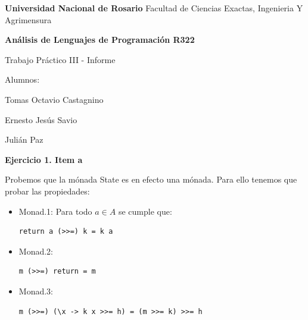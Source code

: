 \begin{flushleft}

  \begin{center}
    \textbf{\Huge{Universidad Nacional de Rosario}}
    \huge{Facultad de Ciencias Exactas, Ingenieria Y Agrimensura}\emptyline\emptyline
    \emptyline
    
    \textbf{\huge{Análisis de Lenguajes de Programación R322}}\emptyline
        
    \huge{Trabajo Práctico III - Informe}\emptyline\emptyline

    \huge{Alumnos:}
  
    \Large{Tomas Octavio Castagnino}

    \Large{Ernesto Jesús Savio}

    \Large{Julián Paz}                
  \end{center}

\newpage{}

\newpage\textbf{\large{Ejercicio 1. Item a}}

Probemos que la mónada State es en efecto una mónada. Para ello tenemos que probar las propiedades:

  \begin{itemize}
    \item Monad.1: Para todo $a\in A$ se cumple que:

      \begin{center}
        \begin{lstlisting}[style=haskellStyle]
            return a (>>=) k = k a
        \end{lstlisting}
      \end{center}

    \item Monad.2: 

      \begin{center}
        \begin{lstlisting}[style=haskellStyle]
            m (>>=) return = m
        \end{lstlisting}
      \end{center}

    \item Monad.3:

      \begin{center}
        \begin{lstlisting}[style=haskellStyle]
            m (>>=) (\x -> k x >>= h) = (m >>= k) >>= h
        \end{lstlisting}
      \end{center}


\end{itemize}
\end{flushleft}

